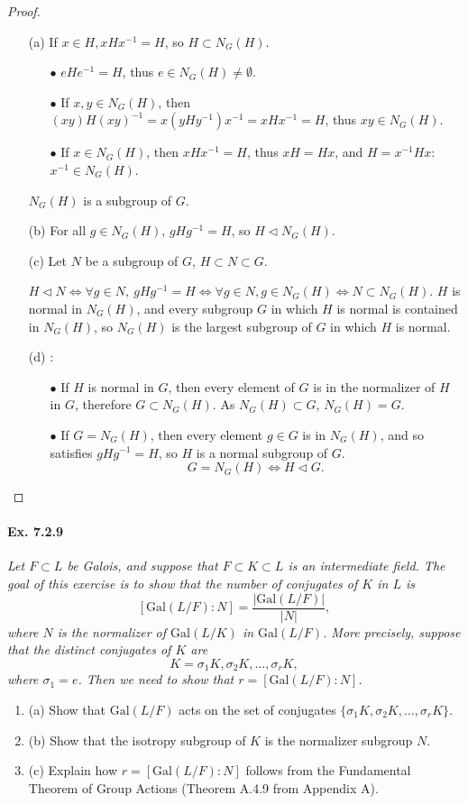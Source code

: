 \documentclass[11pt,a4paper]{article}
\newcommand{\be} {\begin{enumerate}}
\newcommand{\ee} {\end{enumerate}}
\newcommand{\Gal}{\mathrm{Gal}}
\begin{document}
\begin{proof}
\begin{enumerate}
\item[(a)] If $x \in H, x H x^{-1} = H$, so $H \subset N_G(H)$.

\be
\item[$\bullet$] $e H e^{-1} = H$, thus $e \in N_G(H)\neq \emptyset$.

\item[$\bullet$]  If $x,y \in N_G(H)$, then $(xy) H (xy)^{-1} = x(yHy^{-1})x^{-1} = xHx^{-1} = H$, thus $xy \in N_G(H)$.

\item[$\bullet$]  If $x \in N_G(H)$, then $x Hx^{-1} =H$, thus $xH = Hx$, and $H = x^{-1}H x$:
 ${x^{-1} \in N_G(H)}$.
\ee
$N_G(H)$ is a subgroup of $G$. 

\item[(b)]
For all $g \in N_G(H)$, $g H g^{-1} = H$, so $H \lhd N_G(H)$.

\item[(c)]
Let $N$ be a subgroup of $G$, $H \subset N \subset G$.

 $ H \lhd N \iff \forall g\in N,\ gHg^{-1} = H \iff \forall g\in N, g \in N_G(H) \iff N \subset N_G(H).$
$H$ is normal in $N_G(H)$, and every subgroup $G$ in which $H$ is normal is contained in $N_G(H)$, so $N_G(H)$ is the largest subgroup of $G$ in which $H$ is normal.

\item[(d)] :
\be
\item[$\bullet$]  If $H$ is normal in $G$, then every element of $G$ is in the normalizer of  $H$ in $G$, therefore $G \subset N_G(H)$. As $N_G(H) \subset G$, $N_G(H) = G$.
\item[$\bullet$]  If $G = N_G(H)$, then every element $g \in G$ is in $N_G(H)$, and so satisfies $gH g^{-1} = H$, so $H$ is a normal subgroup of $G$.
$$ G = N_G(H) \iff H \lhd G.$$
\ee
\end{enumerate}
\end{proof}

\paragraph{Ex. 7.2.9}

{\it Let $F \subset L$ be Galois, and suppose that $F \subset K \subset L$ is an intermediate field. The goal of this exercise is to show that the number of conjugates of $K$ in $L$ is
$$[\Gal(L/F):N] = \frac{|\Gal(L/F)|}{|N|},$$
where $N$ is the normalizer of $\Gal(L/K)$ in $\Gal(L/F)$. More precisely, suppose that the distinct conjugates of $K$ are
$$K = \sigma_1 K,\sigma_2 K,\ldots,\sigma_r K,$$
where $\sigma_1 = e$. Then we need to show that $r = [\Gal(L/F):N]$.
\be
\item[(a)] Show that $\Gal(L/F)$ acts on the set of conjugates $\{\sigma_1 K,\sigma_2 K,\ldots,\sigma_r K\}$.
\item[(b)] Show that the isotropy subgroup of $K$ is the normalizer subgroup $N$.
\item[(c)] Explain how $r = [\Gal(L/F):N]$ follows from the Fundamental Theorem of Group Actions (Theorem A.4.9 from Appendix A).
\ee
}
\end{document}
